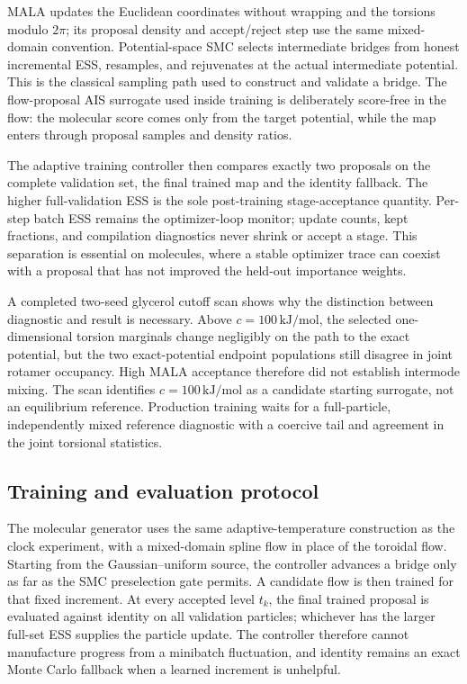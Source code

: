 \documentclass{article}
\begin{document}
MALA updates the Euclidean coordinates without wrapping and the torsions modulo \(2\pi\); its proposal density and accept/reject step use the same mixed-domain convention. Potential-space SMC selects intermediate bridges from honest incremental ESS, resamples, and rejuvenates at the actual intermediate potential. This is the classical sampling path used to construct and validate a bridge. The flow-proposal AIS surrogate used inside training is deliberately score-free in the flow: the molecular score comes only from the target potential, while the map enters through proposal samples and density ratios.

The adaptive training controller then compares exactly two proposals on the complete validation set, the final trained map and the identity fallback. The higher full-validation ESS is the sole post-training stage-acceptance quantity. Per-step batch ESS remains the optimizer-loop monitor; update counts, kept fractions, and compilation diagnostics never shrink or accept a stage. This separation is essential on molecules, where a stable optimizer trace can coexist with a proposal that has not improved the held-out importance weights.

A completed two-seed glycerol cutoff scan shows why the distinction between diagnostic and result is necessary. Above \(c=100\,\mathrm{kJ/mol}\), the selected one-dimensional torsion marginals change negligibly on the path to the exact potential, but the two exact-potential endpoint populations still disagree in joint rotamer occupancy. High MALA acceptance therefore did not establish intermode mixing. The scan identifies \(c=100\,\mathrm{kJ/mol}\) as a candidate starting surrogate, not an equilibrium reference. Production training waits for a full-particle, independently mixed reference diagnostic with a coercive tail and agreement in the joint torsional statistics.

\subsection{Training and evaluation protocol}
\label{sec: mol-training}

The molecular generator uses the same adaptive-temperature construction as the clock experiment, with a mixed-domain spline flow in place of the toroidal flow. Starting from the Gaussian--uniform source, the controller advances a bridge only as far as the SMC preselection gate permits. A candidate flow is then trained for that fixed increment. At every accepted level \(t_k\), the final trained proposal is evaluated against identity on all validation particles; whichever has the larger full-set ESS supplies the particle update. The controller therefore cannot manufacture progress from a minibatch fluctuation, and identity remains an exact Monte Carlo fallback when a learned increment is unhelpful.
\end{document}
